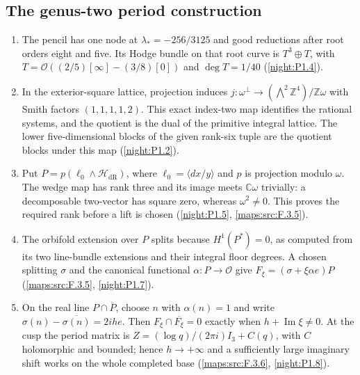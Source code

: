 \subsection{The genus-two period construction}
\RungOne
\begin{enumerate}[label=\arabic*.]
\item The pencil has one node at $\lambda_*=-256/3125$ and good
  reductions after root orders eight and five.  Its Hodge bundle on
  that root curve is $T^3\oplus T$, with
  $T=\mathcal O((2/5)[\infty]-(3/8)[0])$ and
  $\deg T=1/40$ (\cref{night:P1.4}).
\item In the exterior-square lattice, projection induces
  $j:\omega^\perp\to(\bigwedge^2\mathbb Z^4)/\mathbb Z\omega$
  with Smith factors $(1,1,1,1,2)$.  This exact index-two map identifies
  the rational systems, and the quotient is the dual of the primitive
  integral lattice.  The lower five-dimensional blocks of the given
  rank-six tuple are the quotient blocks under this map
  (\cref{night:P1.2}).
\item Put $P=p(\ell_0\wedge\mathcal H_{\mathrm{dR}})$, where
  $\ell_0=\langle dx/y\rangle$ and $p$ is projection modulo $\omega$.
  The wedge map has rank three and its image meets $\mathbb C\omega$
  trivially: a decomposable two-vector has square zero, whereas
  $\omega^2\ne0$.  This proves the required rank before a lift is
  chosen (\cref{night:P1.5}, \cref{maps:src:F.3.5}).
\item The orbifold extension over $P$ splits because
  $H^1(P^*)=0$, as computed from its two line-bundle extensions and
  their integral floor degrees.  A chosen splitting $\sigma$ and
  the canonical functional $\alpha:P\to\mathcal O$ give
  $F_\xi=(\sigma+\xi\alpha e)P$
  (\cref{maps:src:F.3.5}, \cref{night:P1.7}).
\item On the real line $P\cap\overline P$, choose $n$ with
  $\alpha(n)=1$ and write
  $\sigma(n)-\overline{\sigma(n)}=2ih e$.
  Then $F_\xi\cap\overline{F_\xi}=0$ exactly when
  $h+\operatorname{Im}\xi\ne0$.  At the cusp the period matrix is
  $Z=(\log q)/(2\pi i)I_3+C(q)$, with $C$ holomorphic and bounded;
  hence $h\to+\infty$ and a sufficiently large imaginary shift
  works on the whole completed base
  (\cref{maps:src:F.3.6}, \cref{night:P1.8}).
\end{enumerate}

